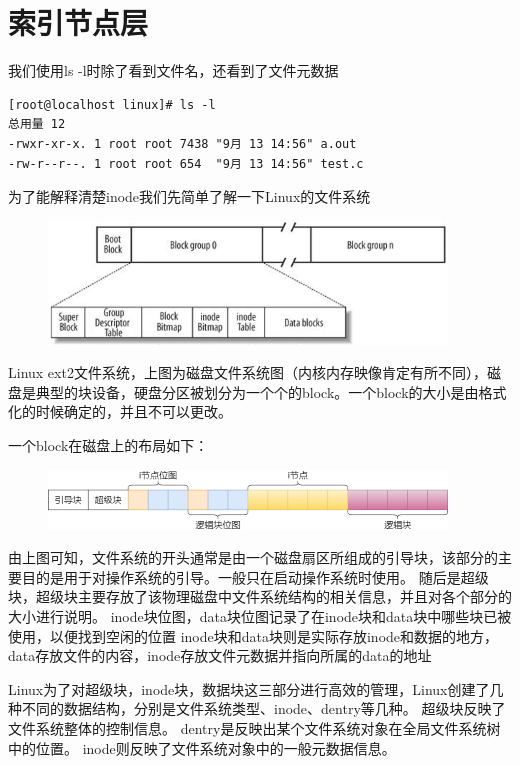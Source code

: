 \section{索引节点层}

我们使用ls -l时除了看到文件名，还看到了文件元数据
\begin{lstlisting}[]
[root@localhost linux]# ls -l
总用量 12
-rwxr-xr-x. 1 root root 7438 "9月 13 14:56" a.out
-rw-r--r--. 1 root root 654  "9月 13 14:56" test.c
\end{lstlisting}

为了能解释清楚inode我们先简单了解一下Linux的文件系统
\begin{figure}[H]
    \centering
    \includegraphics{figures/07-04-磁盘.png}
\end{figure}

Linux ext2文件系统，上图为磁盘文件系统图（内核内存映像肯定有所不同），磁盘是典型的块设备，硬盘分区被划分为一个个的block。一个block的大小是由格式化的时候确定的，并且不可以更改。

一个block在磁盘上的布局如下：
\begin{figure}[H]
    \centering
    \includegraphics{figures/07-04-inode.png}
\end{figure}
由上图可知，文件系统的开头通常是由一个磁盘扇区所组成的引导块，该部分的主要目的是用于对操作系统的引导。一般只在启动操作系统时使用。
随后是超级块，超级块主要存放了该物理磁盘中文件系统结构的相关信息，并且对各个部分的大小进行说明。
inode块位图，data块位图记录了在inode块和data块中哪些块已被使用，以便找到空闲的位置
inode块和data块则是实际存放inode和数据的地方，data存放文件的内容，inode存放文件元数据并指向所属的data的地址

Linux为了对超级块，inode块，数据块这三部分进行高效的管理，Linux创建了几种不同的数据结构，分别是文件系统类型、inode、dentry等几种。
超级块反映了文件系统整体的控制信息。
dentry是反映出某个文件系统对象在全局文件系统树中的位置。
inode则反映了文件系统对象中的一般元数据信息。

